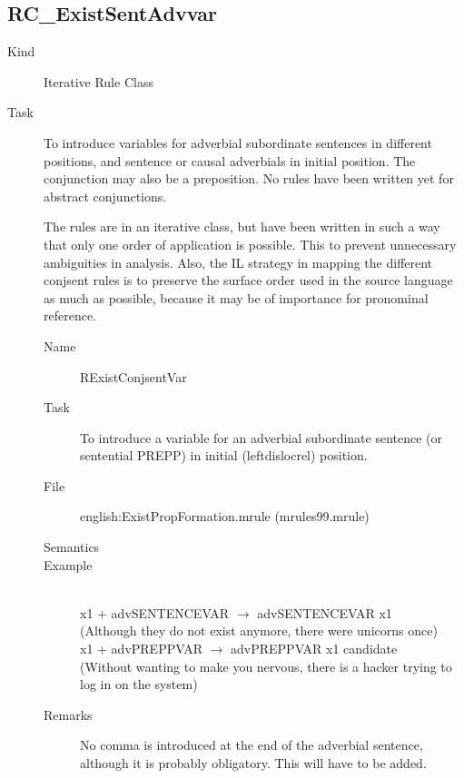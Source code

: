 \subsection{RC\_ExistSentAdvvar}
\begin{description}
\item[Kind] Iterative Rule Class
\item[Task] To introduce variables for adverbial subordinate sentences in 
different positions, and sentence or causal adverbials in initial position. The 
conjunction may also be a preposition. No rules have been written yet for 
abstract conjunctions.

The rules are in an iterative class, but have been written in such a way that 
only one order of application is possible. This to prevent unnecessary 
ambiguities in analysis. Also, the IL strategy in mapping the different 
conjsent rules is to preserve the surface order used in the source language as 
much as possible, because it may be of importance for pronominal reference.

\vspace{1 cm}
\begin{description}
\item[Name] RExistConjsentVar
\item[Task] To introduce a variable for an adverbial subordinate sentence (or 
sentential PREPP) in initial (leftdislocrel) position.
\item[File] english:ExistPropFormation.mrule (mrules99.mrule)
\item[Semantics]
\item[Example] \mbox{}\\
x1 + advSENTENCEVAR $\rightarrow$ advSENTENCEVAR x1 \\
(Although they do not exist anymore, there were unicorns once)\\
x1 + advPREPPVAR $\rightarrow$ advPREPPVAR x1 candidate\\
(Without wanting to make you nervous, there is a hacker trying to log in on the 
system)
\item[Remarks] No comma is introduced at the end of the adverbial sentence, 
although it is probably obligatory. This will have to be added.
\end{description}


\end{description}
